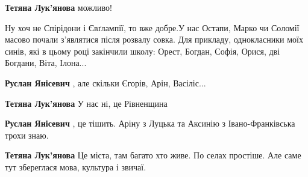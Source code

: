 \begin{itemize}
\begin{itemize}
\textbf{Тетяна Лук'янова} можливо!
\end{itemize}

 

Ну хоч не Спірідони і Євґлампії, то вже добре.\Laughey[1.0][white] У нас Остапи, Марко чи Соломії
масово почали з'являтися після розвалу совка. Для прикладу, однокласники моїх
синів, які в цьому році закінчили школу: Орест, Богдан, Софія, Орися, дві
Богдани, Віта, Ілона...

\begin{itemize}
 
\textbf{Руслан Янісевич} , але скільки Єгорів, Арін, Васіліс...

 
\textbf{Тетяна Лук'янова} У нас ні, це Рівненщина

 
\textbf{Руслан Янісевич} , це тішить. Аріну з Луцька та Аксинію з Івано-Франківська трохи знаю.

 
\textbf{Тетяна Лук'янова} Це міста, там багато хто живе. По селах простіше. Але саме тут збереглася мова, культура і звичаї.

 

\end{itemize}
\end{itemize}
